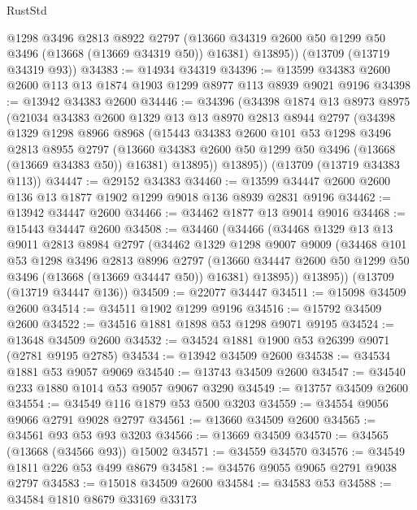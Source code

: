 \begin{lexlean}{RustStd}
\begin{coremodule}
        @1298
        @3496
        @2813
        @8922
        @2797
        (@13660 @34319 @2600 @50 @1299 @50 @3496 (@13668 (@13669 @34319 @50)) @16381)
        @13895))
    (@13709 (@13719 @34319 @93))
@34383 := @14934 @34319
@34396 := @13599 @34383 @2600 @2600 @113 @13 @1874 @1903 @1299 @8977 @113 @8939 @9021 @9196
@34398 := @13942 @34383 @2600
@34446 := @34396
    (@34398
      @1874
      @13
      @8973
      @8975
      (@21034
        @34383
        @2600
        @1329
        @13
        @13
        @8970
        @2813
        @8944
        @2797
        (@34398
          @1329
          @1298
          @8966
          @8968
          (@15443
            @34383
            @2600
            @101
            @53
            @1298
            @3496
            @2813
            @8955
            @2797
            (@13660 @34383 @2600 @50 @1299 @50 @3496 (@13668 (@13669 @34383 @50)) @16381)
            @13895))
        @13895))
    (@13709 (@13719 @34383 @113))
@34447 := @29152 @34383
@34460 := @13599 @34447 @2600 @2600 @136 @13 @1877 @1902 @1299 @9018 @136 @8939 @2831 @9196
@34462 := @13942 @34447 @2600
@34466 := @34462 @1877 @13 @9014 @9016
@34468 := @15443 @34447 @2600
@34508 := @34460
    (@34466
      (@34468
        @1329
        @13
        @13
        @9011
        @2813
        @8984
        @2797
        (@34462
          @1329
          @1298
          @9007
          @9009
          (@34468
            @101
            @53
            @1298
            @3496
            @2813
            @8996
            @2797
            (@13660 @34447 @2600 @50 @1299 @50 @3496 (@13668 (@13669 @34447 @50)) @16381)
            @13895))
        @13895))
    (@13709 (@13719 @34447 @136))
@34509 := @22077 @34447
@34511 := @15098 @34509 @2600
@34514 := @34511 @1902 @1299 @9196
@34516 := @15792 @34509 @2600
@34522 := @34516 @1881 @1898 @53 @1298 @9071 @9195
@34524 := @13648 @34509 @2600
@34532 := @34524 @1881 @1900 @53 @26399 @9071 (@2781 @9195 @2785)
@34534 := @13942 @34509 @2600
@34538 := @34534 @1881 @53 @9057 @9069
@34540 := @13743 @34509 @2600
@34547 := @34540 @233 @1880 @1014 @53 @9057 @9067 @3290
@34549 := @13757 @34509 @2600
@34554 := @34549 @116 @1879 @53 @500 @3203
@34559 := @34554 @9056 @9066 @2791 @9028 @2797
@34561 := @13660 @34509 @2600
@34565 := @34561 @93 @53 @93 @3203
@34566 := @13669 @34509
@34570 := @34565 (@13668 (@34566 @93)) @15002
@34571 := @34559 @34570
@34576 := @34549 @1811 @226 @53 @499 @8679
@34581 := @34576 @9055 @9065 @2791 @9038 @2797
@34583 := @15018 @34509 @2600
@34584 := @34583 @53
@34588 := @34584 @1810 @8679 @33169 @33173

\end{coremodule}
\end{lexlean}
